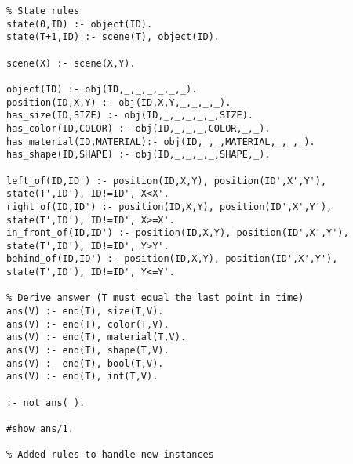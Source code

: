 \begin{lstlisting}
% State rules
state(0,ID) :- object(ID).
state(T+1,ID) :- scene(T), object(ID).

scene(X) :- scene(X,Y).

object(ID) :- obj(ID,_,_,_,_,_,_).
position(ID,X,Y) :- obj(ID,X,Y,_,_,_,_).
has_size(ID,SIZE) :- obj(ID,_,_,_,_,_,SIZE).
has_color(ID,COLOR) :- obj(ID,_,_,_,COLOR,_,_).
has_material(ID,MATERIAL):- obj(ID,_,_,MATERIAL,_,_,_).
has_shape(ID,SHAPE) :- obj(ID,_,_,_,_,SHAPE,_).

left_of(ID,ID') :- position(ID,X,Y), position(ID',X',Y'), state(T',ID'), ID!=ID', X<X'.
right_of(ID,ID') :- position(ID,X,Y), position(ID',X',Y'), state(T',ID'), ID!=ID', X>=X'.
in_front_of(ID,ID') :- position(ID,X,Y), position(ID',X',Y'), state(T',ID'), ID!=ID', Y>Y'.
behind_of(ID,ID') :- position(ID,X,Y), position(ID',X',Y'), state(T',ID'), ID!=ID', Y<=Y'.

% Derive answer (T must equal the last point in time)
ans(V) :- end(T), size(T,V).
ans(V) :- end(T), color(T,V).
ans(V) :- end(T), material(T,V).
ans(V) :- end(T), shape(T,V).
ans(V) :- end(T), bool(T,V).
ans(V) :- end(T), int(T,V).

:- not ans(_).

#show ans/1.

% Added rules to handle new instances
\end{lstlisting}

